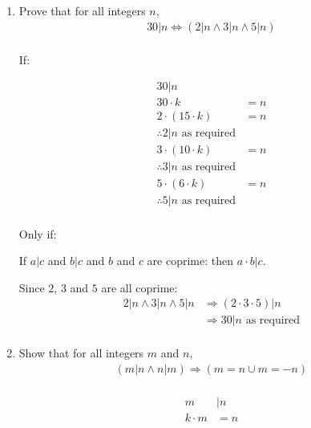 \documentclass[10pt,\jkfside,a4paper]{article}
\begin{document}
\begin{enumerate}
\begin{enumerate}
\end{enumerate}

\item Prove that for all integers $n$,
\begin{equation}
\begin{split}
30 | n \Longleftrightarrow (2|n \wedge 3|n \wedge 5|n)\\
\end{split}
\end{equation}

If:

\begin{equation}
\begin{split}
30|n\\
30\cdot k &= n\\
2\cdot (15\cdot k) &= n\\
\therefore 2|n \text{ as required}\\
3\cdot (10\cdot k) &= n\\
\therefore 3|n \text{ as required}\\
5\cdot (6\cdot k) &= n\\
\therefore 5|n \text{ as required}\\
\end{split}
\end{equation}

Only if:

If $a | c$ and $b | c$ and $b$ and $c$ are coprime: then $a\cdot b | c$.

Since $2$, $3$ and $5$ are all coprime:\\
\begin{equation}
\begin{split}
2 | n \wedge 3 | n \wedge 5 | n 
&\Longrightarrow (2\cdot 3\cdot 5)|n\\
&\Longrightarrow 30|n \text{ as required}\\
\end{split}
\end{equation}

\item Show that for all integers $m$ and $n$,
\begin{equation}
\begin{split}
(m|n \wedge n|m)\Longrightarrow (m=n\cup m=-n)\\
\end{split}
\end{equation}

\begin{equation}\label{mndivideeachother1}
\begin{split}
m &| n\\
k\cdot m &= n\\
\end{split}
\end{equation}


\end{enumerate}
\end{document}
